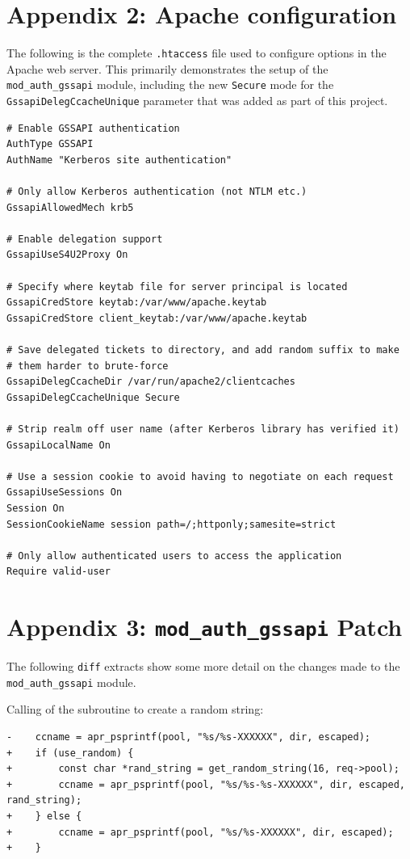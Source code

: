 \documentclass{article}
\begin{document}
\section*{Appendix 2: Apache configuration}
\label{sec:appendix2}

The following is the complete \verb+.htaccess+ file used to configure options in the Apache web server. This primarily demonstrates the setup of the \verb+mod_auth_gssapi+ module, including the new \texttt{Secure} mode for the \texttt{GssapiDelegCcacheUnique} parameter that was added as part of this project.

\begin{verbatim}
# Enable GSSAPI authentication
AuthType GSSAPI
AuthName "Kerberos site authentication"

# Only allow Kerberos authentication (not NTLM etc.)
GssapiAllowedMech krb5

# Enable delegation support
GssapiUseS4U2Proxy On

# Specify where keytab file for server principal is located
GssapiCredStore keytab:/var/www/apache.keytab
GssapiCredStore client_keytab:/var/www/apache.keytab

# Save delegated tickets to directory, and add random suffix to make
# them harder to brute-force
GssapiDelegCcacheDir /var/run/apache2/clientcaches
GssapiDelegCcacheUnique Secure

# Strip realm off user name (after Kerberos library has verified it)
GssapiLocalName On

# Use a session cookie to avoid having to negotiate on each request
GssapiUseSessions On
Session On
SessionCookieName session path=/;httponly;samesite=strict

# Only allow authenticated users to access the application
Require valid-user
\end{verbatim}

\section*{Appendix 3: \texttt{mod\_auth\_gssapi} Patch}
\label{sec:appendix3}

The following \texttt{diff} extracts show some more detail on the changes made to the \verb+mod_auth_gssapi+ module.

Calling of the subroutine to create a random string:

\begin{verbatim}
-    ccname = apr_psprintf(pool, "%s/%s-XXXXXX", dir, escaped);
+    if (use_random) {
+        const char *rand_string = get_random_string(16, req->pool);
+        ccname = apr_psprintf(pool, "%s/%s-%s-XXXXXX", dir, escaped, rand_string);
+    } else {
+        ccname = apr_psprintf(pool, "%s/%s-XXXXXX", dir, escaped);
+    }
\end{verbatim}
\end{document}
